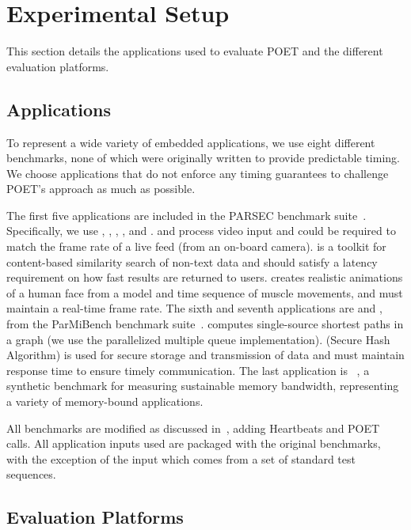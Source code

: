 \section{Experimental Setup}
\label{sec:poet-usage}

This section details the applications used to evaluate POET and the different evaluation platforms.


\subsection{Applications}

To represent a wide variety of embedded applications, we use eight different benchmarks, none of which were originally written to provide predictable timing.
We choose applications that do not enforce any timing guarantees to challenge POET's approach as much as possible.

The first five applications are included in the PARSEC benchmark suite~\cite{parsec}.
Specifically, we use , , , , and .
 and  process video input and could be required to match the frame rate of a live feed (\eg from an on-board camera).
 is a toolkit for content-based similarity search of non-text data and should satisfy a latency requirement on how fast results are returned to users.
 creates realistic animations of a human face from a model and time sequence of muscle movements, and must maintain a real-time frame rate.
The sixth and seventh applications are  and , from the ParMiBench benchmark suite~\cite{parmibench}.
 computes single-source shortest paths in a graph (we use the parallelized multiple queue implementation).
 (Secure Hash Algorithm) is used for secure storage and transmission of data and must maintain response time to ensure timely communication.
The last application is ~\cite{stream}, a synthetic benchmark for measuring sustainable memory bandwidth, representing a variety of memory-bound applications.

All benchmarks are modified as discussed in~, adding Heartbeats and POET calls.
All application inputs used are packaged with the original benchmarks, with the exception of the  input which comes from a set of standard test sequences.


\subsection{Evaluation Platforms}

